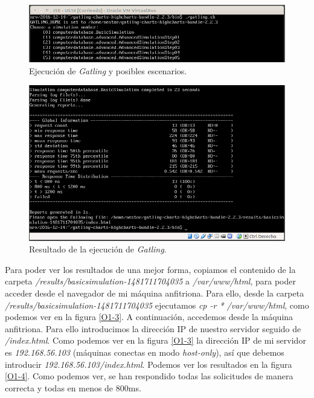 \documentclass[a4paper,titlepage,12pt]{scrartcl}	%
\numberwithin{figure}{section} %
\numberwithin{table}{section} %
\begin{document}
	\begin{figure}[H]
		\includegraphics[width=\linewidth]{./Imagenes/O1-1.png}
		\vspace{-0.5cm}
		\caption[Ejecución de \textit{Gatling} y posibles escenarios.]{Ejecución de \textit{Gatling} y posibles escenarios.}
		\label{O1-1}
	\end{figure}
	
	\begin{figure}[H]
		\includegraphics[width=\linewidth]{./Imagenes/O1-2.png}
		\vspace{-0.5cm}
		\caption[Resultado de la ejecución de \textit{Gatling}.]{Resultado de la ejecución de \textit{Gatling}.}
		\label{O1-2}
	\end{figure}
	
	Para poder ver los resultados de una mejor forma, copiamos el contenido de la carpeta \textit{/results/basicsimulation-1481711704035} a \textit{/var/www/html}, para poder acceder desde el navegador de mi máquina anfitriona. Para ello, desde la carpeta \textit{/results/basicsimulation-1481711704035} ejecutamos \textit{cp -r * /var/www/html}, como podemos ver en la figura \ref{O1-3}. A continuación, accedemos desde la máquina anfitriona. Para ello introducimos la dirección IP de nuestro servidor seguido de \textit{/index.html}. Como podemos ver en la figura \ref{O1-3} la dirección IP de mi servidor es \textit{192.168.56.103} (máquinas conectas en modo \textit{host-only}), así que debemos introducir \textit{192.168.56.103/index.html}. Podemos ver los resultados en la figura \ref{O1-4}. Como podemos ver, se han respondido todas las solicitudes de manera correcta y todas en menos de 800ms. 
	
\end{document}
